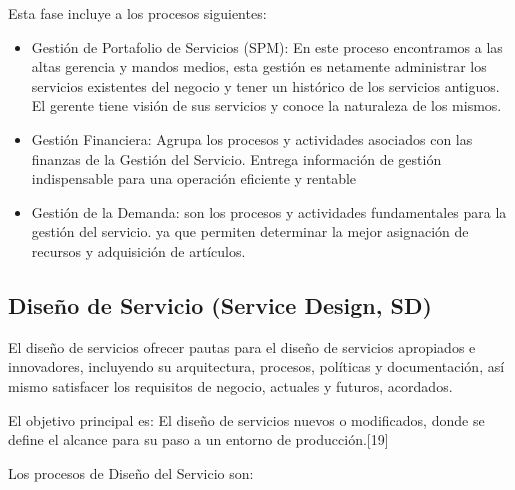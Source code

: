  Esta fase incluye a los procesos siguientes:
 
 \begin{itemize}
 	\item Gestión de Portafolio de Servicios (SPM): En este proceso encontramos a las altas gerencia y mandos medios, esta gestión es netamente administrar los servicios existentes del negocio y tener un histórico de los servicios antiguos. El gerente tiene  visión de sus servicios y conoce la naturaleza de los mismos. 
 	\item 	Gestión Financiera: Agrupa los procesos y actividades asociados con las finanzas de la Gestión del Servicio. Entrega información de gestión indispensable para una operación eficiente y rentable
 \item  Gestión de la Demanda: son los procesos y actividades fundamentales para la gestión del servicio. ya que  permiten determinar la mejor asignación de recursos y  adquisición de artículos.
 	
 \end{itemize}

\subsection{Diseño de Servicio (Service Design, SD)}

 
El diseño de servicios ofrecer pautas para el diseño de servicios apropiados e innovadores, incluyendo su arquitectura, procesos, políticas y documentación, así mismo satisfacer los requisitos de negocio, actuales y futuros, acordados.
 
El objetivo principal es: El diseño de servicios nuevos o modificados, donde se define el alcance para su paso a un entorno de producción.[19]
 
 Los procesos de Diseño del Servicio son: 
 
